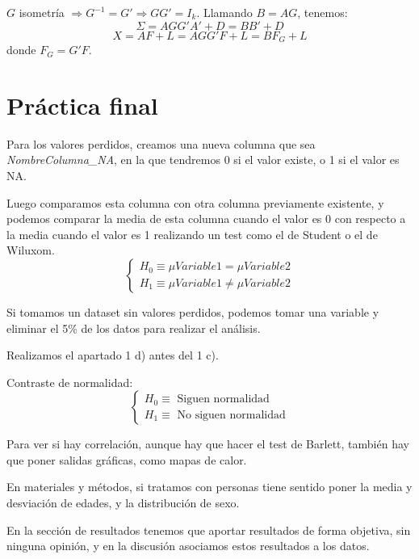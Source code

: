 \documentclass[11pt,a4paper]{article}
\begin{document}
$G$ isometría $\Rightarrow G^{-1} = G' \Rightarrow GG' = I_{k}$.
Llamando $B = AG$, tenemos:
$$\Sigma = AGG'A' + D = BB' + D$$
$$X = AF + L = AGG'F + L = BF_{G} + L$$
donde $F_{G} = G'F$.

\newpage

\section{Práctica final}

Para los valores perdidos, creamos una nueva columna que sea \emph{NombreColumna\_NA}, en la que tendremos 0 si el valor existe, o 1 si el valor es NA.

Luego comparamos esta columna con otra columna previamente existente, y podemos comparar la media de esta columna cuando el valor es 0 con respecto a la media cuando el valor es 1 realizando un test como el de Student o el de Wiluxom.
$$\begin{cases}
H_{0} \equiv \mu Variable1 = \mu Variable2 \\
H_{1} \equiv \mu Variable1 \neq \mu Variable2
\end{cases}$$

Si tomamos un dataset sin valores perdidos, podemos tomar una variable y eliminar el 5\% de los datos para realizar el análisis.

Realizamos el apartado 1 d) antes del 1 c).

Contraste de normalidad:
$$\begin{cases}
H_{0} \equiv \text{ Siguen normalidad} \\
H_{1} \equiv \text{ No siguen normalidad}
\end{cases}$$

Para ver si hay correlación, aunque hay que hacer el test de Barlett, también hay que poner salidas gráficas, como mapas de calor.

En materiales y métodos, si tratamos con personas tiene sentido poner la media y desviación de edades, y la distribución de sexo.

En la sección de resultados tenemos que aportar resultados de forma objetiva, sin ninguna opinión, y en la discusión asociamos estos resultados a los datos.
\end{document}
